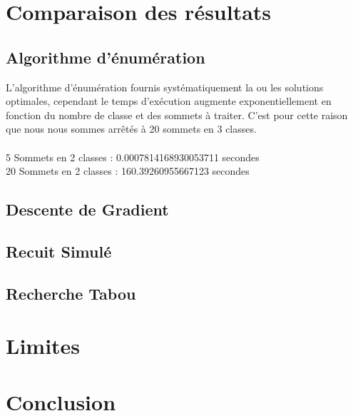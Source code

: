 \documentclass[a4paper]{article}
\begin{document}
\section{Comparaison des résultats}

\subsection{Algorithme d'énumération}
L'algorithme d'énumération fournis systématiquement la ou les solutions optimales, cependant le temps d’exécution augmente exponentiellement en fonction du nombre de classe et des sommets à traiter. C'est pour cette raison que nous nous sommes arrêtés à
 20 sommets en 3 classes.\\\\
5 Sommets en 2 classes : 0.0007814168930053711 secondes\\
20 Sommets en 2 classes : 160.39260955667123 secondes

	\subsection{Descente de Gradient}

	\subsection{Recuit Simulé}

	\subsection{Recherche Tabou}

\section{Limites}

\section{Conclusion}
\end{document}
